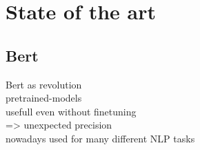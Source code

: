 \chapter{State of the art}
\section{Bert}
Bert as revolution\\
pretrained-models\\
usefull even without finetuning\\
=> unexpected precision\\

nowadays used for many different NLP tasks\\